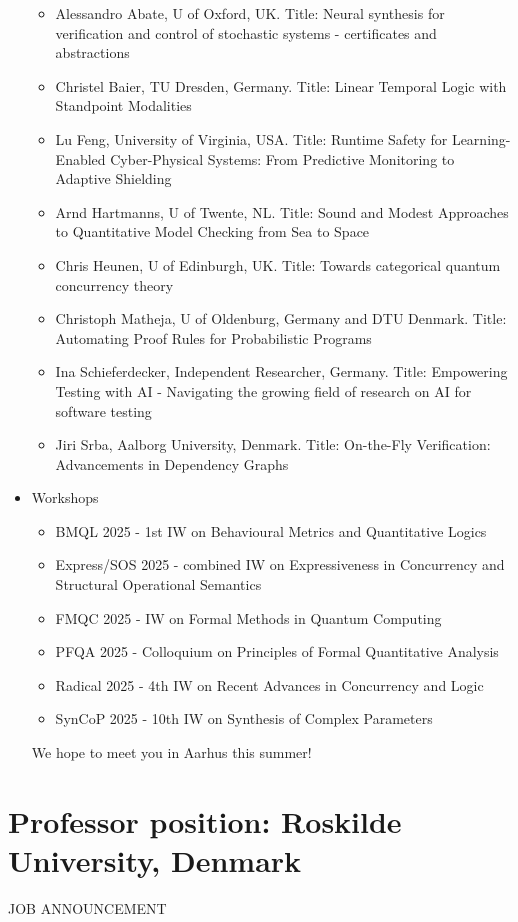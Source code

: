 \documentclass[prodmode,acmtecs]{acmsmall} %
\begin{document}
\begin{itemize}
\begin{itemize}\item  Alessandro Abate, U of Oxford, UK. Title: Neural synthesis for verification and control of stochastic systems - certificates and abstractions
\item  Christel Baier, TU Dresden, Germany. Title: Linear Temporal Logic with Standpoint Modalities
\item  Lu Feng, University of Virginia, USA. Title: Runtime Safety for Learning-Enabled Cyber-Physical Systems: From Predictive Monitoring to Adaptive Shielding
\item  Arnd Hartmanns, U of Twente, NL. Title: Sound and Modest Approaches to Quantitative Model Checking from Sea to Space
\item  Chris Heunen, U of Edinburgh, UK. Title: Towards categorical quantum concurrency theory
\item  Christoph Matheja, U of Oldenburg, Germany and DTU Denmark. Title: Automating Proof Rules for Probabilistic Programs
\item  Ina Schieferdecker, Independent Researcher, Germany. Title: Empowering Testing with AI - Navigating the growing field of research on AI for software testing
\item  Jiri Srba, Aalborg University, Denmark. Title: On-the-Fly Verification: Advancements in Dependency Graphs
\end{itemize} 
\item  Workshops 
 
\begin{itemize}\item  BMQL 2025 - 1st IW on Behavioural Metrics and Quantitative Logics
\item  Express/SOS 2025 - combined IW on Expressiveness in Concurrency and Structural Operational Semantics
\item  FMQC 2025 - IW on Formal Methods in Quantum Computing
\item  PFQA 2025 - Colloquium on Principles of Formal Quantitative Analysis
\item  Radical 2025 -  4th IW on Recent Advances in Concurrency and Logic
\item  SynCoP 2025 - 10th IW on Synthesis of Complex Parameters
\end{itemize} 
  We hope to meet you in Aarhus this summer! 
 
\end{itemize}\section{Professor position: Roskilde University, Denmark}\label{Professorposition}JOB ANNOUNCEMENT 
\end{document}
